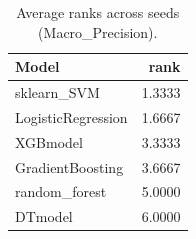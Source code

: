 \begin{table}[t]
\centering
\begin{tabular}{lr}
\toprule
Model & rank \\
\midrule
sklearn_SVM & 1.3333 \\
LogisticRegression & 1.6667 \\
XGBmodel & 3.3333 \\
GradientBoosting & 3.6667 \\
random_forest & 5.0000 \\
DTmodel & 6.0000 \\
\bottomrule
\end{tabular}
\caption{Average ranks across seeds (Macro_Precision).}
\label{tab:avg_rank_Macro_Precision}
\end{table}